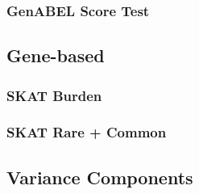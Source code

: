 \documentclass[paper=a4, fontsize=11pt]{scrartcl}	%
\numberwithin{equation}{section}		%
\numberwithin{figure}{section}			%
\numberwithin{table}{section}				%
\begin{document}
		\subsubsection{GenABEL Score Test}
	\subsection{Gene-based}
		\subsubsection{SKAT Burden}
		\subsubsection{SKAT Rare + Common}
		\subsection{Variance Components}

\end{document}
